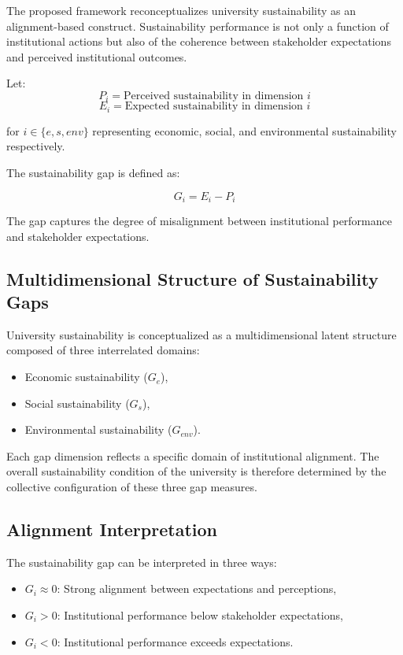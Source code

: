 \documentclass[11pt,a4paper]{article}
\begin{document}
The proposed framework reconceptualizes university sustainability as 
an alignment-based construct. Sustainability performance is not only 
a function of institutional actions but also of the coherence between 
stakeholder expectations and perceived institutional outcomes.

Let:
\[
P_i = \text{Perceived sustainability in dimension } i
\]
\[
E_i = \text{Expected sustainability in dimension } i
\]

for $i \in \{e, s, env\}$ representing economic, social, and environmental 
sustainability respectively.

The sustainability gap is defined as:

\begin{equation}
G_i = E_i - P_i
\end{equation}

The gap captures the degree of misalignment between institutional 
performance and stakeholder expectations.

\subsection{Multidimensional Structure of Sustainability Gaps}

University sustainability is conceptualized as a multidimensional latent 
structure composed of three interrelated domains:

\begin{itemize}
\item Economic sustainability ($G_e$),
\item Social sustainability ($G_s$),
\item Environmental sustainability ($G_{env}$).
\end{itemize}

Each gap dimension reflects a specific domain of institutional alignment. 
The overall sustainability condition of the university is therefore 
determined by the collective configuration of these three gap measures.

\subsection{Alignment Interpretation}

The sustainability gap can be interpreted in three ways:

\begin{itemize}
\item $G_i \approx 0$: Strong alignment between expectations and perceptions,
\item $G_i > 0$: Institutional performance below stakeholder expectations,
\item $G_i < 0$: Institutional performance exceeds expectations.
\end{itemize}
\end{document}
